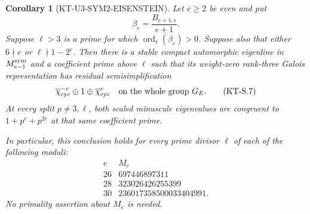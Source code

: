 \documentclass[11pt,a4paper]{article}
\newtheorem{corollary}[theorem]{Corollary}
\theoremstyle{definition}
\begin{document}
\begin{corollary}[KT-U3-SYM2-EISENSTEIN]
Let $e\geq2$ be even and put
\[
      \beta_e=\frac{B_{e+1,\epsilon}}{e+1}.
\]
Suppose $\ell>3$ is a prime for which
$\operatorname{ord}_\ell(\beta_e)>0$.  Suppose also that
either $6\nmid e$ or $\ell\nmid1-2^e$.  Then there is a stable
compact automorphic eigenline in $M_{e-1}^{\rm sym}$ and a
coefficient prime above $\ell$ such that its weight-zero
rank-three Galois representation has residual
semisimplification
\[
 \overline\chi_{\rm cyc}^{-e}\oplus1\oplus
       \overline\chi_{\rm cyc}^{e}
       \quad\hbox{on the whole group }G_E.                     \tag{KT-S.7}
\]
At every split $p\ne3,\ell$, both scaled minuscule eigenvalues
are congruent to $1+p^e+p^{2e}$ at that same coefficient prime.

In particular, this conclusion holds for every prime divisor
$\ell$ of each of the following moduli:
\[
 \begin{array}{c|r}
 e&M_e\\\hline
 26&697446897311\\
 28&323026426255399\\
 30&236017358500033404991.
 \end{array}                                                  \tag{KT-S.8}
\]
No primality assertion about $M_e$ is needed.
\end{corollary}
\end{document}
